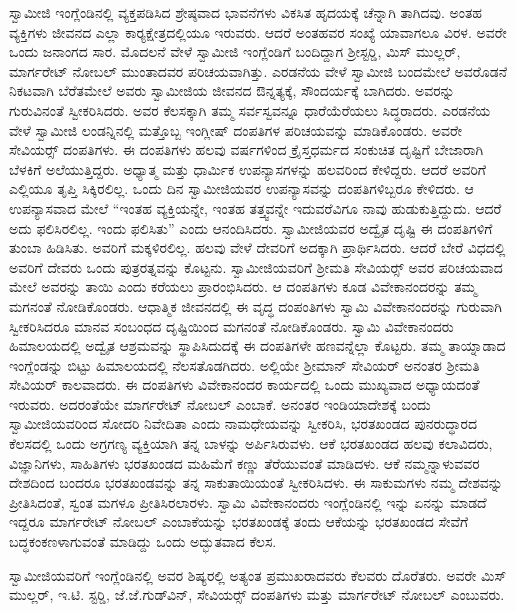  ಸ್ವಾಮೀಜಿ ಇಂಗ್ಲೆಂಡಿನಲ್ಲಿ ವ್ಯಕ್ತಪಡಿಸಿದ ಶ್ರೇಷ್ಠವಾದ ಭಾವನೆಗಳು ವಿಕಸಿತ ಹೃದಯಕ್ಕೆ ಚೆನ್ನಾಗಿ ತಾಗಿದವು. ಅಂತಹ ವ್ಯಕ್ತಿಗಳು ಜೀವನದ ಎಲ್ಲಾ ಕಾರ‍್ಯಕ್ಷೇತ್ರ\break ದಲ್ಲಿಯೂ ಇರುವರು. ಆದರೆ ಅಂತಹವರ ಸಂಖ್ಯೆ ಯಾವಾಗಲೂ ವಿರಳ. ಅವರೇ ಒಂದು ಜನಾಂಗದ ಸಾರ. ಮೊದಲನೆ ವೇಳೆ ಸ್ವಾಮೀಜಿ ಇಂಗ್ಲೆಂಡಿಗೆ ಬಂದಿದ್ದಾಗ ಶ‍್ರೀಸ್ಟರ‍್ಡಿ, ಮಿಸ್ ಮುಲ್ಲರ್, ಮಾರ್ಗರೇಟ್ ನೋಬಲ್ ಮುಂತಾದವರ ಪರಿಚಯವಾಗಿತ್ತು. ಎರಡನೆಯ ವೇಳೆ ಸ್ವಾಮೀಜಿ ಬಂದಮೇಲೆ ಅವರೊಡನೆ ನಿಕಟವಾಗಿ ಬೆರೆತಮೇಲೆ ಅವರು ಸ್ವಾಮೀಜಿಯ ಜೀವನದ ಔನ್ನತ್ಯಕ್ಕೆ, ಸೌಂದರ್ಯಕ್ಕೆ ಬಾಗಿದರು. ಅವರನ್ನು ಗುರುವಿನಂತೆ ಸ್ವೀಕರಿಸಿದರು. ಅವರ ಕೆಲಸಕ್ಕಾಗಿ ತಮ್ಮ ಸರ್ವಸ್ವವನ್ನೂ ಧಾರೆಯೆರೆಯಲು ಸಿದ್ಧರಾದರು. ಎರಡನೆಯ ವೇಳೆ ಸ್ವಾಮೀಜಿ ಲಂಡನ್ನಿನಲ್ಲಿ ಮತ್ತೊಬ್ಬ ಇಂಗ್ಲೀಷ್ ದಂಪತಿಗಳ ಪರಿಚಯವನ್ನು ಮಾಡಿಕೊಂಡರು. ಅವರೇ ಸೇವಿಯರ್ಸ್‍‍ ದಂಪತಿಗಳು. ಈ ದಂಪತಿಗಳು ಹಲವು ವರ್ಷಗಳಿಂದ ಕ್ರೈಸ್ತಧರ್ಮದ ಸಂಕುಚಿತ ದೃಷ್ಟಿಗೆ ಬೇಜಾರಾಗಿ ಬೆಳಕಿಗೆ ಅಲೆಯುತ್ತಿದ್ದರು. ಅಧ್ಯಾತ್ಮ ಮತ್ತು ಧಾರ್ಮಿಕ ಉಪನ್ಯಾಸಗಳನ್ನು ಹಲವರಿಂದ ಕೇಳಿದ್ದರು. ಆದರೆ ಅವರಿಗೆ ಎಲ್ಲಿಯೂ ತೃಪ್ತಿ ಸಿಕ್ಕಿರಲಿಲ್ಲ. ಒಂದು ದಿನ ಸ್ವಾಮೀಜಿಯವರ ಉಪನ್ಯಾಸವನ್ನು ದಂಪತಿಗಳಿಬ್ಬರೂ ಕೇಳಿದರು. ಆ ಉಪನ್ಯಾಸವಾದ ಮೇಲೆ “ಇಂತಹ ವ್ಯಕ್ತಿಯನ್ನೇ, ಇಂತಹ ತತ್ತ್ವವನ್ನೇ ಇದುವರೆವಿಗೂ ನಾವು ಹುಡುಕುತ್ತಿದ್ದುದು. ಆದರೆ ಅದು ಫಲಿಸಿರಲಿಲ್ಲ. ಇಂದು ಫಲಿಸಿತು” ಎಂದು ಆನಂದಿಸಿದರು. ಸ್ವಾಮೀಜಿಯವರ ಅದ್ವೈತ ದೃಷ್ಟಿ ಈ ದಂಪತಿಗಳಿಗೆ ತುಂಬಾ ಹಿಡಿಸಿತು. ಅವರಿಗೆ ಮಕ್ಕಳಿರಲಿಲ್ಲ. ಹಲವು ವೇಳೆ ದೇವರಿಗೆ ಅದಕ್ಕಾಗಿ ಪ್ರಾರ್ಥಿಸಿದರು. ಆದರೆ ಬೇರೆ ವಿಧದಲ್ಲಿ ಅವರಿಗೆ ದೇವರು ಒಂದು ಪುತ್ರರತ್ನವನ್ನು ಕೊಟ್ಟನು. ಸ್ವಾಮೀಜಿಯವರಿಗೆ ಶ‍್ರೀಮತಿ ಸೇವಿಯರ್ಸ್‍‍ ಅವರ ಪರಿಚಯವಾದ ಮೇಲೆ ಅವರನ್ನು ತಾಯಿ ಎಂದು ಕರೆಯಲು ಪ್ರಾರಂಭಿಸಿದರು. ಆ ದಂಪತಿಗಳು ಕೂಡ ವಿವೇಕಾನಂದರನ್ನು ತಮ್ಮ ಮಗನಂತೆ ನೋಡಿಕೊಂಡರು. ಆಧಾತ್ಮಿಕ ಜೀವನದಲ್ಲಿ ಈ ವೃದ್ಧ ದಂಪಂತಿಗಳು ಸ್ವಾಮಿ ವಿವೇಕಾನಂದರನ್ನು ಗುರುವಾಗಿ ಸ್ವೀಕರಿಸಿದರೂ ಮಾನವ ಸಂಬಂಧದ ದೃಷ್ಟಿಯಿಂದ ಮಗನಂತೆ ನೋಡಿಕೊಂಡರು. ಸ್ವಾಮಿ ವಿವೇಕಾನಂದರು ಹಿಮಾಲಯದಲ್ಲಿ ಅದ್ವೈತ ಆಶ್ರಮವನ್ನು ಸ್ಥಾಪಿಸಿದುದಕ್ಕೆ ಈ ದಂಪತಿಗಳೇ ಹಣವನ್ನೆಲ್ಲಾ ಕೊಟ್ಟರು. ತಮ್ಮ ತಾಯ್ನಾಡಾದ ಇಂಗ್ಲೆಂಡನ್ನು ಬಿಟ್ಟು ಹಿಮಾಲಯದಲ್ಲಿ ನೆಲಸತೊಡಗಿದರು. ಅಲ್ಲಿಯೇ ಶ‍್ರೀಮಾನ್ ಸೇವಿಯರ್ ಅನಂತರ ಶ‍್ರೀಮತಿ ಸೇವಿಯರ್ ಕಾಲವಾದರು. ಈ ದಂಪತಿಗಳು ವಿವೇಕಾನಂದರ ಕಾರ್ಯದಲ್ಲಿ ಒಂದು ಮುಖ್ಯವಾದ ಅಧ್ಯಾಯದಂತೆ ಇರುವರು. ಅದರಂತೆಯೇ ಮಾರ್ಗರೇಟ್ ನೋಬಲ್ ಎಂಬಾಕೆ. ಅನಂತರ ಇಂಡಿಯಾದೇಶಕ್ಕೆ ಬಂದು ಸ್ವಾಮೀಜಿಯವರಿಂದ ಸೋದರಿ ನಿವೇದಿತಾ ಎಂದು ನಾಮಧೇಯವನ್ನು ಸ್ವೀಕರಿಸಿ, ಭರತಖಂಡದ ಪುನರುದ್ಧಾರದ ಕೆಲಸದಲ್ಲಿ ಒಂದು ಅಗ್ರಗಣ್ಯ ವ್ಯಕ್ತಿಯಾಗಿ ತನ್ನ ಬಾಳನ್ನು ಅರ್ಪಿಸಿರುವಳು. ಆಕೆ ಭರತಖಂಡದ ಹಲವು ಕಲಾವಿದರು, ವಿಜ್ಞಾನಿಗಳು, ಸಾಹಿತಿಗಳು ಭರತಖಂಡದ ಮಹಿಮೆಗೆ ಕಣ್ಣು ತೆರೆಯುವಂತೆ ಮಾಡಿದಳು. ಆಕೆ ನಮ್ಮನ್ನಾಳುವವರ ದೇಶದಿಂದ ಬಂದರೂ ಭರತಖಂಡವನ್ನು ತನ್ನ ಸಾಕುತಾಯಿಯಂತೆ ಸ್ವೀಕರಿಸಿದಳು. ಈ ಸಾಕುಮಗಳು ನಮ್ಮ ದೇಶವನ್ನು ಪ್ರೀತಿಸಿದಂತೆ, ಸ್ವಂತ ಮಗಳೂ ಪ್ರೀತಿಸಿರಲಾರಳು. ಸ್ವಾಮಿ ವಿವೇಕಾನಂದರು ಇಂಗ್ಲೆಂಡಿನಲ್ಲಿ ಇನ್ನು ಏನನ್ನು ಮಾಡದೆ ಇದ್ದರೂ ಮಾರ್ಗರೇಟ್ ನೋಬಲ್ ಎಂಬಾಕೆಯನ್ನು ಭರತಖಂಡಕ್ಕೆ ತಂದು ಆಕೆಯನ್ನು ಭರತಖಂಡದ ಸೇವೆಗೆ ಬದ್ಧಕಂಕಣಳಾಗುವಂತೆ ಮಾಡಿದ್ದು ಒಂದು ಅದ್ಭುತವಾದ ಕೆಲಸ. 

 ಸ್ವಾಮೀಜಿಯವರಿಗೆ ಇಂಗ್ಲೆಂಡಿನಲ್ಲಿ ಅವರ ಶಿಷ್ಯರಲ್ಲಿ ಅತ್ಯಂತ ಪ್ರಮುಖರಾದವರು ಕೆಲವರು ದೊರೆತರು. ಅವರೇ ಮಿಸ್ ಮುಲ್ಲರ್, ಇ.ಟಿ. ಸ್ಟರ‍್ಡಿ, ಜೆ.ಜೆ.ಗುಡ್‍ವಿನ್, ಸೇವಿಯರ್ಸ್‍‍ ದಂಪತಿಗಳು ಮತ್ತು ಮಾರ್ಗರೇಟ್ ನೋಬಲ್ ಎಂಬುವರು. 

